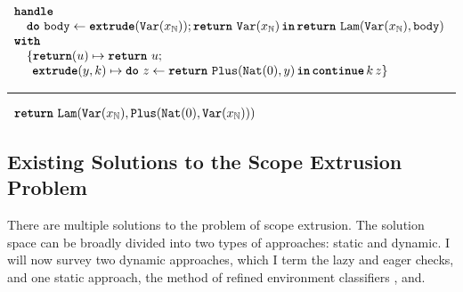 
\begin{code}
  \begin{efflst}
    $\begin{array}{l}
      \textbf{\texttt{handle}} \\
      \quad \texttt{\textbf{do}} \,\, {\texttt{body}} \leftarrow {\textbf{\texttt{extrude}}({\texttt{Var}(x_{\mathbb{N}})}); \texttt{\textbf{return}} \,\, {\texttt{Var}(x_{\mathbb{N}})}} \, \textbf{\texttt{in}} \, {\texttt{\textbf{return}} \,\, {\texttt{Lam}(\texttt{Var}(x_{\mathbb{N}}), \texttt{body})}} \\
      \textbf{\texttt{with}} \\
      \quad \{ \textbf{\texttt{return}}(u) \mapsto \texttt{\textbf{return}} \,\, {u}; \\
      \quad \; \, \textbf{\texttt{extrude}}(y, k) \mapsto { \texttt{\textbf{do}} \,\, {z} \leftarrow {\texttt{\textbf{return}} \,\, {\texttt{Plus}({\texttt{Nat}({0})}, y)}} \, \textbf{\texttt{in}} \, {\textbf{\texttt{continue}} \, {k} \, {z}}} \}\\
    \end{array}$

    \vspace{2mm} 
\textcolor{effComment}{\hrule height 0.2mm \relax}
\vspace{2mm} 

\textcolor{effComment}{$\begin{array}{l}\texttt{\textbf{return}} \,\, {\texttt{Lam}(\texttt{Var}(x_{\mathbb{N}}), \texttt{Plus}(\texttt{Nat}({0}), \texttt{Var}(x_{\mathbb{N}})))}\end{array}$}

\end{efflst}
\label{listing:efflang-maybe-scope-extrusion}
\end{code}


\subsection{Existing Solutions to the Scope Extrusion Problem}
There are multiple solutions to the problem of scope extrusion. The solution space can be broadly divided into two types of approaches: static and dynamic. I will now survey two dynamic approaches, which I term the lazy and eager checks, and one static approach, the method of refined environment classifiers \citep{kiselyov-16,isoda-24}, and. 

